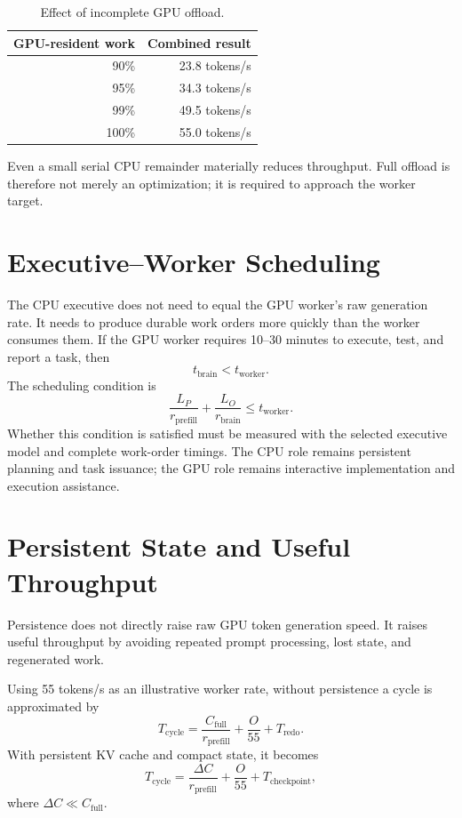 \documentclass[11pt]{article}
\begin{document}
\begin{table}[h]
\centering
\caption{Effect of incomplete GPU offload.}
\label{tab:offload}
\begin{tabular}{rr}
\toprule
GPU-resident work & Combined result \\
\midrule
90\% & 23.8 tokens/s \\
95\% & 34.3 tokens/s \\
99\% & 49.5 tokens/s \\
100\% & 55.0 tokens/s \\
\bottomrule
\end{tabular}
\end{table}

Even a small serial CPU remainder materially reduces throughput. Full offload is therefore not merely an optimization; it is required to approach the worker target.

\section{Executive--Worker Scheduling}

The CPU executive does not need to equal the GPU worker's raw generation rate. It needs to produce durable work orders more quickly than the worker consumes them. If the GPU worker requires 10--30 minutes to execute, test, and report a task, then
\[
t_{\mathrm{brain}} < t_{\mathrm{worker}}.
\]
The scheduling condition is
\[
\frac{L_P}{r_{\mathrm{prefill}}} + \frac{L_O}{r_{\mathrm{brain}}}
\leq t_{\mathrm{worker}}.
\]
Whether this condition is satisfied must be measured with the selected executive model and complete work-order timings. The CPU role remains persistent planning and task issuance; the GPU role remains interactive implementation and execution assistance.

\section{Persistent State and Useful Throughput}

Persistence does not directly raise raw GPU token generation speed. It raises useful throughput by avoiding repeated prompt processing, lost state, and regenerated work.

Using 55 tokens/s as an illustrative worker rate, without persistence a cycle is approximated by
\[
T_{\mathrm{cycle}} = \frac{C_{\mathrm{full}}}{r_{\mathrm{prefill}}}
+ \frac{O}{55} + T_{\mathrm{redo}}.
\]
With persistent KV cache and compact state, it becomes
\[
T_{\mathrm{cycle}} = \frac{\Delta C}{r_{\mathrm{prefill}}}
+ \frac{O}{55} + T_{\mathrm{checkpoint}},
\]
where $\Delta C \ll C_{\mathrm{full}}$.
\end{document}

